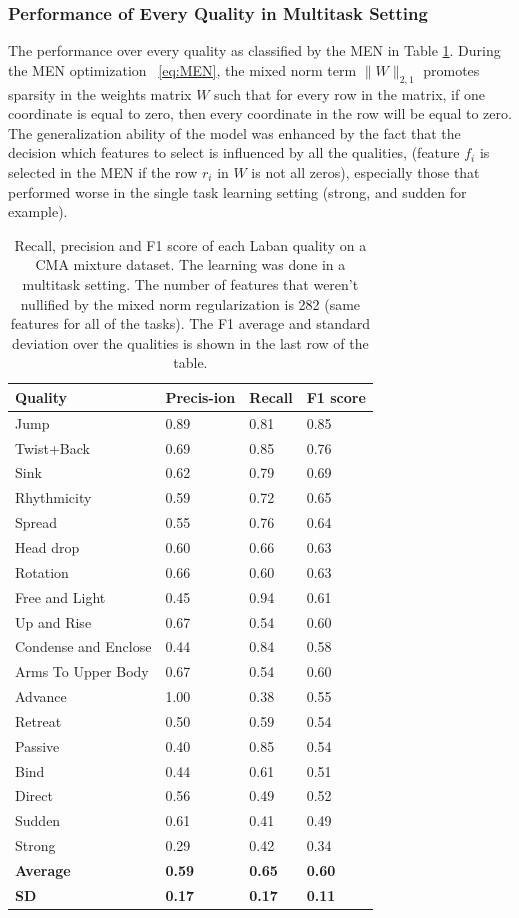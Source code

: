 \documentclass[11pt,twocolumn,varwidth=true,a4paper,fleqn]{article}
\begin{document}
\subsubsection{Performance of Every Quality in Multitask Setting}
The performance over every quality as classified by the MEN in Table
\ref{mixedSummary}. During the MEN optimization ~\eqref{eq:MEN}, the mixed norm 
term $\|W\|_{2,1}$  promotes sparsity in the weights matrix $W$ such that for 
every row in the matrix, if one coordinate is equal to zero, then every coordinate 
in the row will be equal to zero.
\\The generalization ability of the model was enhanced by the fact that the
decision which features to select is influenced by all the qualities, (feature $f_i$ is selected in the MEN if the row $r_i$ in $W$ is not all zeros), especially those that performed worse in the single task learning setting (strong, and sudden for example).
\begin{table}
	  	\centering
		\begin{tabular}{|p{3cm}|p{0.9cm}|p{0.9cm}|p{0.9cm}|}
		\hline
		Quality&Precis-ion&Recall&F1 score\\\hline
		Jump&0.89&0.81&0.85\\\hline
		Twist+Back&0.69&0.85&0.76\\\hline
		Sink&0.62&0.79&0.69\\\hline
		Rhythmicity&0.59&0.72&0.65\\\hline
		Spread&0.55&0.76&0.64\\\hline
		Head drop&0.60&0.66&0.63\\\hline
		Rotation&0.66&0.60&0.63\\\hline
		Free and Light&0.45&0.94&0.61\\\hline
		Up and Rise&0.67&0.54&0.60\\\hline
		Condense and Enclose&0.44&0.84&0.58\\\hline
		Arms To Upper Body&0.67&0.54&0.60\\\hline
		Advance&1.00&0.38&0.55\\\hline
		Retreat&0.50&0.59&0.54\\\hline
		Passive&0.40&0.85&0.54\\\hline
		Bind&0.44&0.61&0.51\\\hline
		Direct&0.56&0.49&0.52\\\hline
		Sudden&0.61&0.41&0.49\\\hline
		Strong&0.29&0.42&0.34\\\hline
		\textbf{Average}&\textbf{0.59}&\textbf{0.65}&\textbf{0.60}\\\hline
		\textbf{SD}&\textbf{0.17}&\textbf{0.17}&\textbf{0.11}\\\hline
		\end{tabular}
		\caption{Recall, precision and F1 score of each Laban quality on a CMA
		   mixture dataset. The learning was done in a multitask setting. The number of
		   features that weren't nullified by the mixed norm regularization is
		   282 (same features for all of the tasks). The F1 average and standard
		   deviation over the qualities is shown in the last row of the table.}
	   \label{mixedSummary}
	\end{table}
\end{document}
